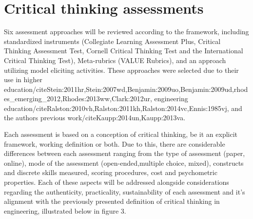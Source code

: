 \section{Critical thinking assessments}


Six assessment approaches will be reviewed according to the framework, including standardized instruments (Collegiate Learning Assessment Plus, Critical Thinking Assessment Test, Cornell Critical Thinking Test and the International Critical Thinking Test), Meta-rubrics (VALUE Rubrics), and an approach utilizing model eliciting activities.  These approaches were selected due to their use in higher education/cite{Stein:2011hr,Stein:2007wd,Benjamin:2009uo,Benjamin:2009ud,rhodes_emerging_2012,Rhodes:2013ww,Clark:2012ur}, engineering education/cite{Ralston:2010vh,Ralston:2011kh,Ralston:2014vc,Ennis:1985vj}, and the authors previous work/cite{Kaupp:2014un,Kaupp:2013va}.



Each assessment is based on a conception of critical thinking, be it an explicit framework, working definition or both.  Due to this, there are considerable differences between each assessment ranging from the type of assessment (paper, online), mode of the assessment (open-ended,multiple choice, mixed), constructs and discrete skills measured, scoring procedures, cost and psychometric properties.  Each of these aspects will be addressed alongside considerations regarding the  authenticity, practicality, sustainability of each assessment and it's alignment with the previously presented definition of critical thinking in engineering, illustrated below in figure 3.

